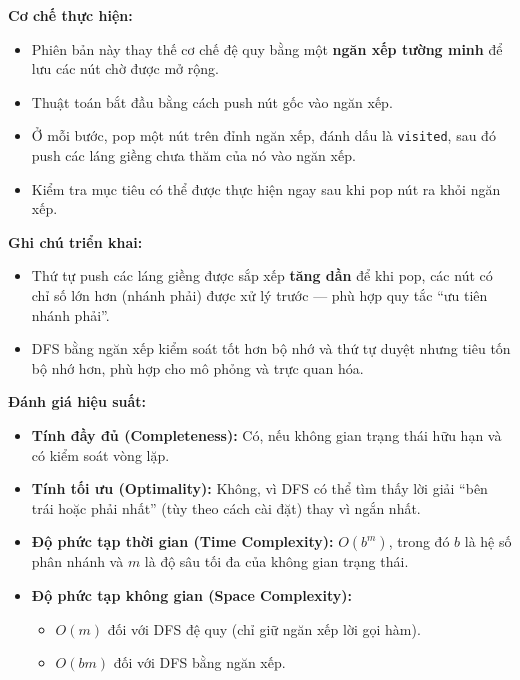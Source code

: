 \textbf{Cơ chế thực hiện:}
\begin{itemize}
    \item Phiên bản này thay thế cơ chế đệ quy bằng một \textbf{ngăn xếp tường minh} để lưu các nút chờ được mở rộng.
    \item Thuật toán bắt đầu bằng cách push nút gốc vào ngăn xếp.
    \item Ở mỗi bước, pop một nút trên đỉnh ngăn xếp, đánh dấu là \texttt{visited}, sau đó push các láng giềng chưa thăm của nó vào ngăn xếp.
    \item Kiểm tra mục tiêu có thể được thực hiện ngay sau khi pop nút ra khỏi ngăn xếp.
\end{itemize}

\textbf{Ghi chú triển khai:}
\begin{itemize}
    \item Thứ tự push các láng giềng được sắp xếp \textbf{tăng dần} để khi pop, các nút có chỉ số lớn hơn (nhánh phải) được xử lý trước — phù hợp quy tắc “ưu tiên nhánh phải”.
    \item DFS bằng ngăn xếp kiểm soát tốt hơn bộ nhớ và thứ tự duyệt nhưng tiêu tốn bộ nhớ hơn, phù hợp cho mô phỏng và trực quan hóa.
\end{itemize}

\textbf{Đánh giá hiệu suất:} \cite{lecture2025}
\begin{itemize}
    \item \textbf{Tính đầy đủ (Completeness):} Có, nếu không gian trạng thái hữu hạn và có kiểm soát vòng lặp.
    \item \textbf{Tính tối ưu (Optimality):} Không, vì DFS có thể tìm thấy lời giải “bên trái hoặc phải nhất” (tùy theo cách cài đặt) thay vì ngắn nhất.
    \item \textbf{Độ phức tạp thời gian (Time Complexity):} $O(b^m)$, trong đó $b$ là hệ số phân nhánh và $m$ là độ sâu tối đa của không gian trạng thái.
    \item \textbf{Độ phức tạp không gian (Space Complexity):} 
    \begin{itemize}
        \item $O(m)$ đối với DFS đệ quy (chỉ giữ ngăn xếp lời gọi hàm).
        \item $O(bm)$ đối với DFS bằng ngăn xếp.
    \end{itemize}
\end{itemize}
